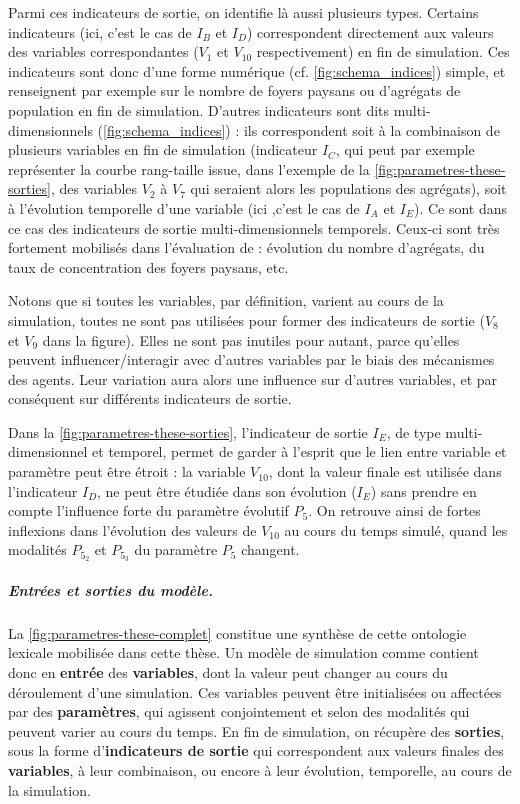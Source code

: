 Parmi ces indicateurs de sortie, on identifie là aussi plusieurs types.
Certains indicateurs (ici, c'est le cas de $I_B$ et $I_D$) correspondent directement aux valeurs des variables correspondantes ($V_1$ et $V_{10}$ respectivement) en fin de simulation.
Ces indicateurs sont donc d'une forme numérique (cf. \cref{fig:schema_indices}) simple, et renseignent par exemple sur le nombre de foyers paysans ou d'agrégats de population en fin de simulation.
D'autres indicateurs sont dits \og multi-dimensionnels\fg{} (\cref{fig:schema_indices}) : ils correspondent soit à la combinaison de plusieurs variables en fin de simulation (indicateur $I_C$, qui peut par exemple représenter la courbe rang-taille issue, dans l'exemple de la \cref{fig:parametres-these-sorties}, des variables $V_2$ à $V_7$ qui seraient alors les populations des agrégats), soit à l'évolution temporelle d'une variable (ici ,c'est le cas de $I_A$ et $I_E$).
Ce sont dans ce cas des indicateurs de sortie multi-dimensionnels temporels.
Ceux-ci sont très fortement mobilisés dans l'évaluation de \simfeodal{} : évolution du nombre d'agrégats, du taux de concentration des foyers paysans, etc.

Notons que si toutes les variables, par définition, varient au cours de la simulation, toutes ne sont pas utilisées pour former des indicateurs de sortie ($V_8$ et $V_9$ dans la figure).
Elles ne sont pas \og inutiles\fg{} pour autant, parce qu'elles peuvent influencer/interagir avec d'autres variables par le biais des mécanismes des agents.
Leur variation aura alors une influence sur d'autres variables, et par conséquent sur différents indicateurs de sortie.

Dans la \cref{fig:parametres-these-sorties}, l'indicateur de sortie $I_E$, de type multi-dimensionnel et temporel, permet de garder à l'esprit que le lien entre variable et paramètre peut être étroit : la variable $V_{10}$, dont la valeur finale est utilisée dans l'indicateur $I_D$, ne peut être étudiée dans son évolution ($I_E$) sans prendre en compte l'influence forte du paramètre évolutif $P_5$.
On retrouve ainsi de fortes inflexions dans l'évolution des valeurs de $V_{10}$ au cours du temps simulé, quand les modalités $P_{5_2}$ et $P_{5_3}$ du paramètre $P_5$ changent.


\subparagraph{Entrées et sorties du modèle.}
La \cref{fig:parametres-these-complet} constitue une synthèse de cette \og ontologie\fg{} lexicale mobilisée dans cette thèse.
Un modèle de simulation comme \simfeodal{} contient donc en \textbf{entrée} des \textbf{variables}, dont la valeur peut changer au cours du déroulement d'une simulation.
Ces variables peuvent être initialisées ou affectées par des \textbf{paramètres}, qui agissent conjointement et selon des modalités qui peuvent varier au cours du temps.
En fin de simulation, on récupère des \textbf{sorties}, sous la forme d'\textbf{indicateurs de sortie} qui correspondent aux valeurs finales des \textbf{variables}, à leur combinaison, ou encore à leur évolution, temporelle, au cours de la simulation.

